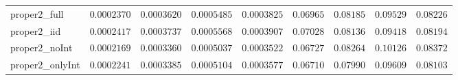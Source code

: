 \begin{table}
\begin{tabular}{lcccccccc}
proper2_full  & $0.0002370$ & $0.0003620$ & $0.0005485$ & $0.0003825$ & $0.06965$ & $0.08185$ & $0.09529$ & $0.08226$ \\
proper2_iid  & $0.0002417$ & $0.0003737$ & $0.0005568$ & $0.0003907$ & $0.07028$ & $0.08136$ & $0.09418$ & $0.08194$ \\
proper2_noInt  & $0.0002169$ & $0.0003360$ & $0.0005037$ & $0.0003522$ & $0.06727$ & $0.08264$ & $0.10126$ & $0.08372$ \\
proper2_onlyInt  & $0.0002241$ & $0.0003385$ & $0.0005104$ & $0.0003577$ & $0.06710$ & $0.07990$ & $0.09609$ & $0.08103$ \\
\hline 
\end{tabular}


\end{table}